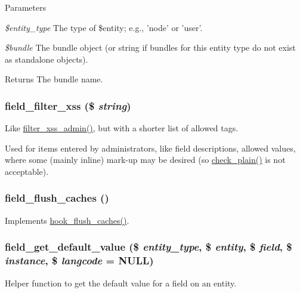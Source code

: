 \begin{DoxyParams}{Parameters}
\item[{\em \$entity\_\-type}]The type of \$entity; e.g., 'node' or 'user'. \item[{\em \$bundle}]The bundle object (or string if bundles for this entity type do not exist as standalone objects). \end{DoxyParams}
\begin{DoxyReturn}{Returns}
The bundle name. 
\end{DoxyReturn}
\hypertarget{group__field_ga181095248684b8b5a45c08ab8d22a813}{
\subsubsection[{field\_\-filter\_\-xss}]{\setlength{\rightskip}{0pt plus 5cm}field\_\-filter\_\-xss (\$ {\em string})}}
\label{group__field_ga181095248684b8b5a45c08ab8d22a813}
Like \hyperlink{group__sanitization_ga97dcceb77b76539219af2a85eacbe18d}{filter\_\-xss\_\-admin()}, but with a shorter list of allowed tags.

Used for items entered by administrators, like field descriptions, allowed values, where some (mainly inline) mark-\/up may be desired (so \hyperlink{group__sanitization_ga76fc67a30fd8d75ddd80565e6e65a13d}{check\_\-plain()} is not acceptable). \hypertarget{group__field_ga756e79c6b9be66a9ea28b6d9c97a4ad9}{
\subsubsection[{field\_\-flush\_\-caches}]{\setlength{\rightskip}{0pt plus 5cm}field\_\-flush\_\-caches ()}}
\label{group__field_ga756e79c6b9be66a9ea28b6d9c97a4ad9}
Implements \hyperlink{group__hooks_ga66531e6e564157b7ca45ed07549c9b97}{hook\_\-flush\_\-caches()}. \hypertarget{group__field_gac80e479e60b75dd09dfb706e04c05899}{
\subsubsection[{field\_\-get\_\-default\_\-value}]{\setlength{\rightskip}{0pt plus 5cm}field\_\-get\_\-default\_\-value (\$ {\em entity\_\-type}, \/  \$ {\em entity}, \/  \$ {\em field}, \/  \$ {\em instance}, \/  \$ {\em langcode} = {\ttfamily NULL})}}
\label{group__field_gac80e479e60b75dd09dfb706e04c05899}
Helper function to get the default value for a field on an entity.


